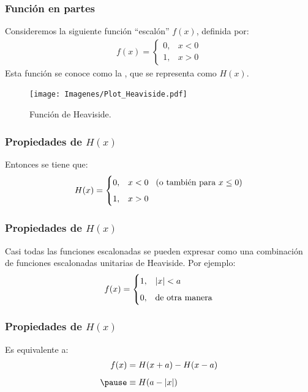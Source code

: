 \begin{frame}
\frametitle{Función en partes}
Consideremos la siguiente función \enquote{escalón} $f (x)$, definida por:
\pause
\begin{align*}
f (x) = \begin{cases}
0, & x < 0 \\[0.5em]
1, & x > 0
\end{cases}
\end{align*}
Esta función se conoce como la , que se representa como $H (x)$.
\end{frame}
\begin{frame}[plain]
\begin{figure}[H]
  \centering
  \texttt{[image: Imagenes/Plot\_Heaviside.pdf]}
  \caption{Función de Heaviside.}
  \label{fig:figura_plot_Heaviside}
\end{figure}
\end{frame}
\begin{frame}
\frametitle{Propiedades de $H (x)$}
Entonces se tiene que:
\pause
\begin{align*}
H (x) = \begin{cases}
0, & x < 0 \hspace{0.3cm} (\mbox{o también para } x \leq 0 ) \\[0.5em]
1, & x > 0
\end{cases}
\end{align*}
\end{frame}
\begin{frame}
\frametitle{Propiedades de $H (x)$}
Casi todas las funciones escalonadas se pueden expresar como una combinación de funciones escalonadas unitarias de Heaviside. Por ejemplo:
\pause
\begin{align*}
f (x) = \begin{cases}
1, & \abs{x} < a \\[0.5em]
0, & \mbox{de otra manera}
\end{cases}
\end{align*}
\end{frame}
\begin{frame}
\frametitle{Propiedades de $H (x)$}
Es equivalente a:
\pause
\begin{eqnarray*}
\begin{aligned}
f (x) &= H (x + a) - H (x- a) \\[0.5em] \pause
&\equiv H (a - \abs{x})
\end{aligned}
\end{eqnarray*}
\end{frame}
